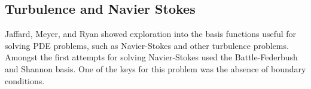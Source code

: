 





\subsection {Turbulence and Navier Stokes}
Jaffard, Meyer, and Ryan showed exploration into the basis functions useful for solving PDE problems, such as Navier-Stokes and other turbulence problems.  Amongst the first attempts for solving Navier-Stokes used the Battle-Federbush and Shannon basis.  One of the keys for this problem was the absence of boundary conditions.  

